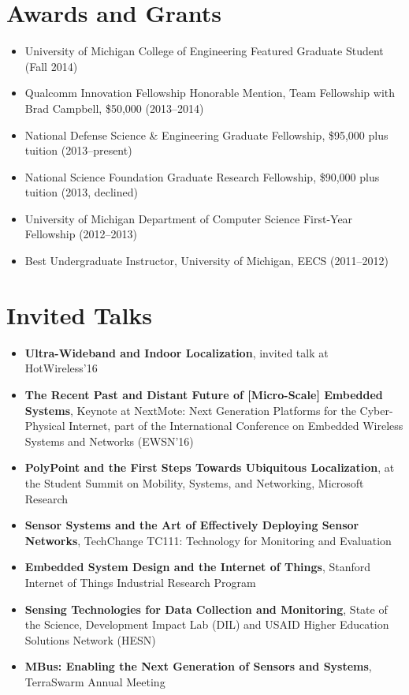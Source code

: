 \documentclass{article}
\begin{document}
\section*{Awards and Grants}

\begin{itemize}

  \item[] University of Michigan College of Engineering Featured Graduate Student (Fall 2014)
  \item[] Qualcomm Innovation Fellowship Honorable Mention, Team Fellowship with Brad Campbell, \$50,000 (2013--2014)
  \item[] National Defense Science \& Engineering Graduate Fellowship, \$95,000 plus tuition (2013--present)
  \item[] National Science Foundation Graduate Research Fellowship, \$90,000 plus tuition (2013, declined)
  \item[] University of Michigan Department of Computer Science First-Year Fellowship (2012--2013)
  \item[] Best Undergraduate Instructor, University of Michigan, EECS (2011--2012)

\end{itemize}

\section*{Invited Talks}

\begin{itemize}
  \item[] \textbf{Ultra-Wideband and Indoor Localization}, invited talk at
    HotWireless'16
  \item[] \textbf{The Recent Past and Distant Future of [Micro-Scale] Embedded Systems},
    Keynote at NextMote: Next Generation Platforms for the Cyber-Physical Internet,
    part of the International Conference on Embedded Wireless Systems and Networks (EWSN'16)
  \item[] \textbf{PolyPoint and the First Steps Towards Ubiquitous
      Localization}, at the Student Summit on Mobility, Systems, and
    Networking, Microsoft Research
  \item[] \textbf{Sensor Systems and the Art of Effectively Deploying Sensor Networks},
    TechChange TC111: Technology for Monitoring and Evaluation
  \item[] \textbf{Embedded System Design and the Internet of Things},
    Stanford Internet of Things Industrial Research Program
  \item[] \textbf{Sensing Technologies for Data Collection and Monitoring},
    State of the Science, Development Impact Lab (DIL) and USAID Higher Education Solutions Network (HESN)
  \item[] \textbf{MBus: Enabling the Next Generation of Sensors and Systems},
    TerraSwarm Annual Meeting
\end{itemize}
\end{document}
